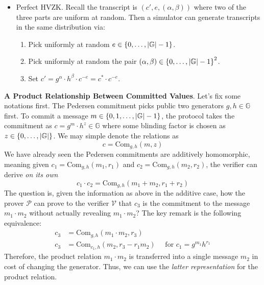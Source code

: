 \documentclass{article}
\begin{document}
\begin{itemize}
\item Perfect HVZK. Recall the transcript is $(c', e, (\alpha, \beta))$ where two of the three parts are uniform at random. Then a simulator can generate transcripts in the same distribution via: 

\begin{enumerate}
\item\label{item:38} Pick uniformly at random $e \in \left\{ 0, \dots, \abs{\mathbb{G}} - 1 \right\}$. 
\item\label{item:45} Pick uniformly at random the pair $(\alpha, \beta) \in \left\{ 0, \dots, \abs{\mathbb{G}} - 1 \right\}^2$. 
\item\label{item:46} Set $c' = g^{\alpha} \cdot h^{\beta} \cdot c^{-e} = c^{\displaystyle *} \cdot c^{-e}$.
\end{enumerate}
\end{itemize}

\textbf{A Product Relationship Between Committed Values}. Let's fix some notations first. The Pedersen commitment picks public two generators $g, h \in \mathbb{G}$ first. To commit a message $m \in \left\{ 0, 1, \dots, \abs{\mathbb{G}} - 1 \right\}$, the protocol takes the commitment as $c = g^m \cdot h^z \in \mathbb{G}$ where some blinding factor is chosen as $z \in \left\{ 0, \dots, \abs{\mathbb{G}} \right\}$. We may simple denote the relations as
\begin{equation*}
c = \text{Com}_{g, h}(m, z)
\end{equation*}
We have already seen the Pedersen commitments are additively homomorphic, meaning given $c_{1} = \text{Com}_{g, h}(m_{1}, r_1)$ and $c_{2} = \text{Com}_{g, h}(m_{2}, r_2)$, the verifier can derive \textit{on its own}
\begin{equation*}
c_1 \cdot c_2 = \text{Com}_{g, h}(m_1 + m_2, r_1 + r_2)
\end{equation*}
The question is, given the information as above in the additive case,  how the prover $\mathcal{P}$ can prove to the verifier $\mathcal{V}$ that $c_3$ is the commitment to the message $m_1 \cdot m_2$ without actually revealing $m_1 \cdot m_2$? The key remark is the following equivalence:
\begin{equation*}
\begin{split}
c_{3} & = \text{Com}_{g, h}(m_1 \cdot m_2, r_3) \\
c_3 & = \text{Com}_{c_1, h}(m_2, r_3 - r_1m_2) \quad \text{ for } c_1 = g^{m_1} h^{r_1}
\end{split}
\end{equation*}
Therefore, the product relation $m_1 \cdot m_2$ is transferred into a single message $m_2$ in cost of changing the generator. Thus, we can use the \textit{latter representation} for the product relation. 
\end{document}
